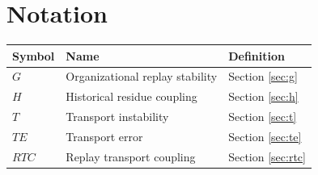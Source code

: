\section{Notation}
\label{app:notation}


\begin{tabular}{lll}
Symbol & Name & Definition \\
\hline
$G$ & Organizational replay stability & Section \ref{sec:g} \\
$H$ & Historical residue coupling & Section \ref{sec:h} \\
$T$ & Transport instability & Section \ref{sec:t} \\
$TE$ & Transport error & Section \ref{sec:te} \\
$RTC$ & Replay transport coupling & Section \ref{sec:rtc} \\
\end{tabular}
